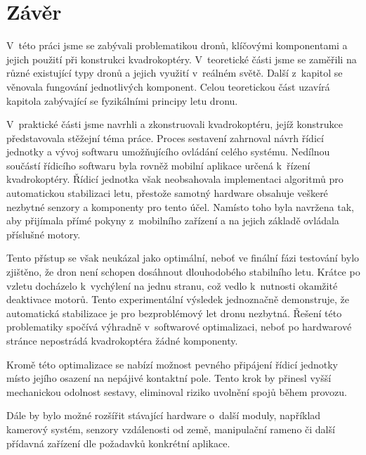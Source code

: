 \documentclass[12pt]{report}
\begin{document}
\chapter*{Závěr}
	
V~této práci jsme se zabývali problematikou dronů, klíčovými komponentami a jejich použití při konstrukci kvadrokoptéry. V~teoretické části jsme se zaměřili na různé existující typy dronů a jejich využití v~reálném světě. Další z~kapitol se věnovala fungování jednotlivých komponent. Celou teoretickou část uzavírá kapitola zabývající se fyzikálními principy letu dronu.

V~praktické části jsme navrhli a zkonstruovali kvadrokoptéru, jejíž konstrukce představovala stěžejní téma práce. Proces sestavení zahrnoval návrh řídicí jednotky a vývoj softwaru umožňujícího ovládání celého systému. Nedílnou součástí řídicího softwaru byla rovněž mobilní aplikace určená k~řízení kvadrokoptéry. Řídicí jednotka však neobsahovala implementaci algoritmů pro automatickou stabilizaci letu, přestože samotný hardware obsahuje veškeré nezbytné senzory a komponenty pro tento účel. Namísto toho byla navržena tak, aby přijímala přímé pokyny z~mobilního zařízení a na jejich základě ovládala příslušné motory.

Tento přístup se však neukázal jako optimální, neboť ve finální fázi testování bylo zjištěno, že dron není schopen dosáhnout dlouhodobého stabilního letu. Krátce po vzletu docházelo k~vychýlení na jednu stranu, což vedlo k~nutnosti okamžité deaktivace motorů. Tento experimentální výsledek jednoznačně demonstruje, že automatická stabilizace je pro bezproblémový let dronu nezbytná. Řešení této problematiky spočívá výhradně v~softwarové optimalizaci, neboť po hardwarové stránce nepostrádá kvadrokoptéra žádné komponenty.

Kromě této optimalizace se nabízí možnost pevného připájení řídicí jednotky místo jejího osazení na nepájivé kontaktní pole. Tento krok by přinesl vyšší mechanickou odolnost sestavy, eliminoval riziko uvolnění spojů během provozu.

Dále by bylo možné rozšířit stávající hardware o~další moduly, například kamerový systém, senzory vzdálenosti od země, manipulační rameno či další přídavná zařízení dle požadavků konkrétní aplikace.
	
\nocite{*}
\printbibliography					%
\printglossary[title={Zkratky}]		%
\listoffigures						%
\end{document}
